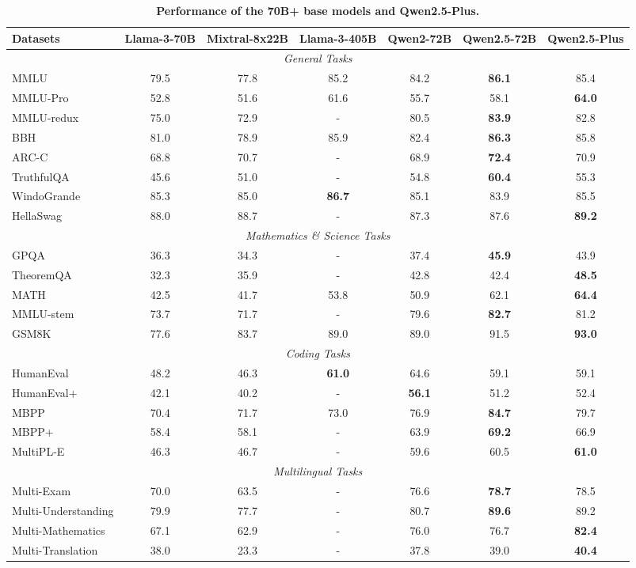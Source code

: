 \begin{table}[tbp]
\centering
\caption{\textbf{Performance of the 70B+ base models and Qwen2.5-Plus.}}
\label{tab:base-70B}
\small %
\setlength{\tabcolsep}{3pt} %
\renewcommand{\arraystretch}{0.9} 

\begin{tabular}{@{}lcccccc@{}}
\toprule
\textbf{Datasets} & \textbf{Llama-3-70B} & \textbf{Mixtral-8x22B} & \textbf{Llama-3-405B} & \textbf{Qwen2-72B} & \textbf{Qwen2.5-72B} & \textbf{Qwen2.5-Plus} \\
\midrule
\multicolumn{7}{c}{\textit{General Tasks}} \\
\midrule
MMLU & 79.5 & 77.8 & 85.2 & 84.2 & \textbf{86.1} & 85.4 \\
MMLU-Pro & 52.8 & 51.6 & 61.6 & 55.7 & 58.1 & \textbf{64.0} \\
MMLU-redux & 75.0 & 72.9 & - & 80.5 & \textbf{83.9} & 82.8 \\
BBH & 81.0 & 78.9 & 85.9 & 82.4 & \textbf{86.3} & 85.8 \\
ARC-C & 68.8 & 70.7 & - & 68.9 & \textbf{72.4} & 70.9 \\
TruthfulQA & 45.6 & 51.0 & - & 54.8 & \textbf{60.4} & 55.3 \\
WindoGrande & 85.3 & 85.0 & \textbf{86.7} & 85.1 & 83.9 & 85.5 \\
HellaSwag & 88.0 & 88.7 & - & 87.3 & 87.6 & \textbf{89.2} \\
\midrule
\multicolumn{7}{c}{\textit{Mathematics \& Science Tasks}} \\
\midrule
GPQA & 36.3 & 34.3 & - & 37.4 & \textbf{45.9} & 43.9\\
TheoremQA & 32.3 & 35.9 & - & 42.8 & 42.4 & \textbf{48.5} \\
MATH & 42.5 & 41.7 & 53.8 & 50.9 & 62.1 & \textbf{64.4} \\
MMLU-stem & 73.7 & 71.7 & - & 79.6 & \textbf{82.7} & 81.2 \\
GSM8K & 77.6 & 83.7 & 89.0 & 89.0 & 91.5 & \textbf{93.0} \\
\midrule
\multicolumn{7}{c}{\textit{Coding Tasks}} \\
\midrule
HumanEval & 48.2 & 46.3 & \textbf{61.0} & 64.6 & 59.1 & 59.1 \\
HumanEval+ & 42.1 & 40.2 & - & \textbf{56.1} & 51.2 & 52.4\\
MBPP & 70.4 & 71.7 & 73.0 & 76.9 & \textbf{84.7} & 79.7\\
MBPP+ & 58.4 & 58.1 & - & 63.9 & \textbf{69.2} & 66.9 \\
MultiPL-E & 46.3 & 46.7 & - & 59.6 & 60.5 & \textbf{61.0} \\
\midrule
\multicolumn{7}{c}{\textit{Multilingual Tasks}} \\
\midrule
Multi-Exam & 70.0 & 63.5 & - & 76.6 & \textbf{78.7} & 78.5 \\
Multi-Understanding & 79.9 & 77.7 & - & 80.7 & \textbf{89.6} & 89.2 \\
Multi-Mathematics & 67.1 & 62.9 & - & 76.0 & 76.7 & \textbf{82.4} \\
Multi-Translation & 38.0 & 23.3 & - & 37.8 & 39.0 & \textbf{40.4} \\
\bottomrule
\end{tabular}
\end{table}


